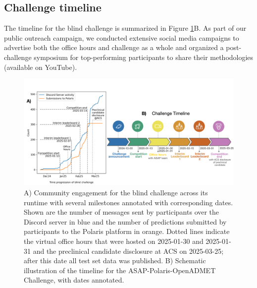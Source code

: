 \documentclass[journal=jcim,manuscript=article]{achemso}
\begin{document}
\subsection*{Challenge timeline} 


The timeline for the blind challenge is summarized in Figure \ref{fgr:timeline_engagement}B.
As part of our public outreach campaign, we conducted extensive social media campaigns to advertise both the office hours and challenge as a whole and organized a post-challenge symposium for top-performing participants to share their methodologies (available on YouTube). 


\begin{figure}
    \includegraphics[scale=0.58]{02_figs_community/community_progress_and_timeline.png}
  \caption{A) Community engagement for the blind challenge across its runtime with several milestones annotated with corresponding dates. Shown are the number of messages sent by participants over the Discord server in blue and the number of predictions submitted by participants to the Polaris platform in orange. Dotted lines indicate the virtual office hours that were hosted on 2025-01-30 and 2025-01-31 and the preclinical candidate disclosure at ACS on 2025-03-25; after this date all test set data was published. B) Schematic illustration of the timeline for the ASAP-Polaris-OpenADMET Challenge, with dates annotated.}
  \label{fgr:timeline_engagement}
\end{figure}
\end{document}
